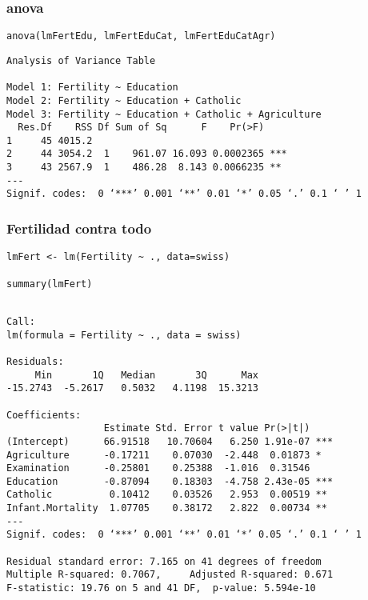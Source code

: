 \documentclass{beamer}
\begin{document}
\begin{frame}[fragile]
\frametitle{anova}
\label{sec-3-8}


\lstset{language=R}
\begin{lstlisting}
anova(lmFertEdu, lmFertEduCat, lmFertEduCatAgr)
\end{lstlisting}


\begin{verbatim}
Analysis of Variance Table

Model 1: Fertility ~ Education
Model 2: Fertility ~ Education + Catholic
Model 3: Fertility ~ Education + Catholic + Agriculture
  Res.Df    RSS Df Sum of Sq      F    Pr(>F)    
1     45 4015.2                                  
2     44 3054.2  1    961.07 16.093 0.0002365 ***
3     43 2567.9  1    486.28  8.143 0.0066235 ** 
---
Signif. codes:  0 ‘***’ 0.001 ‘**’ 0.01 ‘*’ 0.05 ‘.’ 0.1 ‘ ’ 1
\end{verbatim}
\end{frame}
\begin{frame}[fragile]
\frametitle{Fertilidad contra todo}
\label{sec-3-9}


\lstset{language=R}
\begin{lstlisting}
lmFert <- lm(Fertility ~ ., data=swiss)

summary(lmFert)
\end{lstlisting}


\begin{verbatim}

Call:
lm(formula = Fertility ~ ., data = swiss)

Residuals:
     Min       1Q   Median       3Q      Max 
-15.2743  -5.2617   0.5032   4.1198  15.3213 

Coefficients:
                 Estimate Std. Error t value Pr(>|t|)    
(Intercept)      66.91518   10.70604   6.250 1.91e-07 ***
Agriculture      -0.17211    0.07030  -2.448  0.01873 *  
Examination      -0.25801    0.25388  -1.016  0.31546    
Education        -0.87094    0.18303  -4.758 2.43e-05 ***
Catholic          0.10412    0.03526   2.953  0.00519 ** 
Infant.Mortality  1.07705    0.38172   2.822  0.00734 ** 
---
Signif. codes:  0 ‘***’ 0.001 ‘**’ 0.01 ‘*’ 0.05 ‘.’ 0.1 ‘ ’ 1 

Residual standard error: 7.165 on 41 degrees of freedom
Multiple R-squared: 0.7067,     Adjusted R-squared: 0.671 
F-statistic: 19.76 on 5 and 41 DF,  p-value: 5.594e-10
\end{verbatim}
\end{frame}
\end{document}
